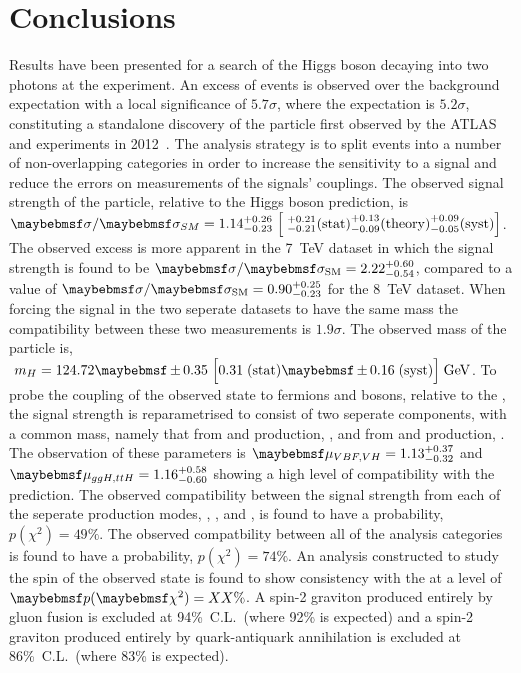 \chapter{Conclusions}
\label{chap:conclusions}

Results have been presented for a search of the \SM Higgs boson decaying into two photons at the \CMS experiment. An excess of events is observed over the background expectation with a local significance of $5.7\sigma$, where the \SM expectation is $5.2\sigma$, constituting a standalone discovery of the particle first observed by the ATLAS and \CMS experiments in 2012~\cite{ATLASDiscovery,CMSDiscovery}. The analysis strategy is to split events into a number of non-overlapping categories in order to increase the sensitivity to a signal and reduce the errors on measurements of the signals' couplings. The observed signal strength of the particle, relative to the \SM Higgs boson prediction, is $\sigma/\sigma_{SM} = 1.14^{+0.26}_{-0.23} \;\Bigl[\;^{+0.21}_{-0.21} \mathrm{(stat)} ^{+0.13}_{-0.09} \mathrm{(theory)} ^{+0.09}_{-0.05} \mathrm{(syst)} \Bigr]$. The observed excess is more apparent in the 7~TeV dataset in which the signal strength is found to be $\musm=2.22^{+0.60}_{-0.54}$, compared to a value of $\musm=0.90^{+0.25}_{-0.23}$ for the 8~TeV dataset. When forcing the signal in the two seperate datasets to have the same mass the compatibility between these two measurements is $1.9\sigma$. The observed mass of the particle is, $\;m_{H} = 124.72 \pm 0.35 \; \Bigl[ 0.31 \mathrm{\;(stat)} \pm 0.16 \mathrm{\;(syst)} \Bigr] \mathrm{\;GeV}$. To probe the coupling of the observed state to fermions and bosons, relative to the \SM, the signal strength is reparametrised to consist of two seperate components, with a common mass, namely that from \ggH and \ttH production, \RF, and from \VBF and \VH production, \RV. The observation of these parameters is $\RF=1.13^{+0.37}_{-0.32}$ and $\RV=1.16^{+0.58}_{-0.60}$ showing a high level of compatibility with the \SM prediction. The observed compatibility between the signal strength from each of the seperate production modes, \ggH, \VBF, \VH and \ttH, is found to have a probability, $p(\chi^{2})=49\%$. The observed compatbility between all of the analysis categories is found to have a probability, $p(\chi^{2})=74\%$. An analysis constructed to study the spin of the observed state is found to show consistency with the \SM at a level of $\p(\chi^{2})=XX\%$. A spin-2 graviton produced entirely by gluon fusion is excluded at 94\%~C.L.~(where 92\% is expected) and a spin-2 graviton produced entirely by quark-antiquark annihilation is excluded at 86\%~C.L.~(where 83\% is expected).

